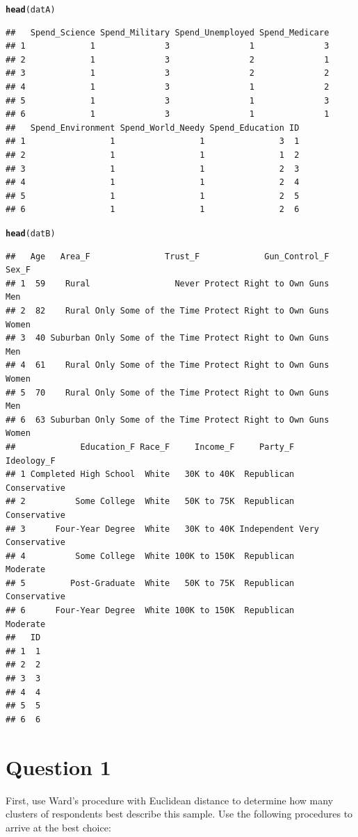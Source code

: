 \documentclass{article}\usepackage[]{graphicx}\usepackage[]{color}
\makeatletter
\newcommand{\hlstd}[1]{\textcolor[rgb]{0.345,0.345,0.345}{#1}}%
\newcommand{\hlkwd}[1]{\textcolor[rgb]{0.737,0.353,0.396}{\textbf{#1}}}%
\newenvironment{kframe}{%
 \def\at@end@of@kframe{}%
 \ifinner\ifhmode%
  \def\at@end@of@kframe{\end{minipage}}%
  \begin{minipage}{\columnwidth}%
 \fi\fi%
 \def\FrameCommand##1{\hskip\@totalleftmargin \hskip-\fboxsep
 \colorbox{shadecolor}{##1}\hskip-\fboxsep
     \hskip-\linewidth \hskip-\@totalleftmargin \hskip\columnwidth}%
 \MakeFramed {\advance\hsize-\width
   \@totalleftmargin\z@ \linewidth\hsize
   \@setminipage}}%
 {\par\unskip\endMakeFramed%
 \at@end@of@kframe}
\newenvironment{knitrout}{}{} %
\makeatother
\begin{document}
\begin{knitrout}
\begin{kframe}
\begin{alltt}
\hlkwd{head}\hlstd{(datA)}
\end{alltt}
\begin{verbatim}
##   Spend_Science Spend_Military Spend_Unemployed Spend_Medicare
## 1             1              3                1              3
## 2             1              3                2              1
## 3             1              3                2              2
## 4             1              3                1              2
## 5             1              3                1              3
## 6             1              3                1              1
##   Spend_Environment Spend_World_Needy Spend_Education ID
## 1                 1                 1               3  1
## 2                 1                 1               1  2
## 3                 1                 1               2  3
## 4                 1                 1               2  4
## 5                 1                 1               2  5
## 6                 1                 1               2  6
\end{verbatim}
\begin{alltt}
\hlkwd{head}\hlstd{(datB)}
\end{alltt}
\begin{verbatim}
##   Age   Area_F               Trust_F             Gun_Control_F Sex_F
## 1  59    Rural                 Never Protect Right to Own Guns   Men
## 2  82    Rural Only Some of the Time Protect Right to Own Guns Women
## 3  40 Suburban Only Some of the Time Protect Right to Own Guns   Men
## 4  61    Rural Only Some of the Time Protect Right to Own Guns Women
## 5  70    Rural Only Some of the Time Protect Right to Own Guns   Men
## 6  63 Suburban Only Some of the Time Protect Right to Own Guns Women
##             Education_F Race_F     Income_F     Party_F        Ideology_F
## 1 Completed High School  White   30K to 40K  Republican      Conservative
## 2          Some College  White   50K to 75K  Republican      Conservative
## 3      Four-Year Degree  White   30K to 40K Independent Very Conservative
## 4          Some College  White 100K to 150K  Republican          Moderate
## 5         Post-Graduate  White   50K to 75K  Republican      Conservative
## 6      Four-Year Degree  White 100K to 150K  Republican          Moderate
##   ID
## 1  1
## 2  2
## 3  3
## 4  4
## 5  5
## 6  6
\end{verbatim}
\end{kframe}
\end{knitrout}

\section{Question 1}
First, use Ward’s procedure with Euclidean distance to determine how many clusters of respondents best describe this sample. Use the following procedures to arrive at the best choice:  
\end{document}
